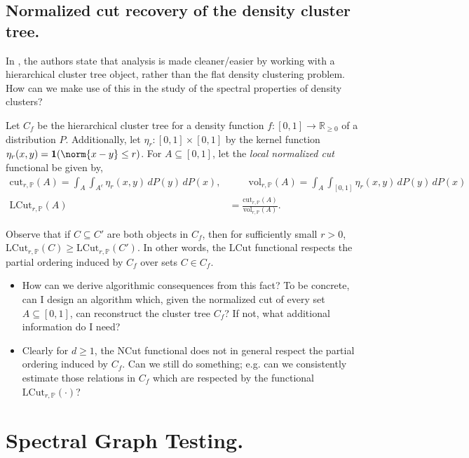 \documentclass{article}
\newcommand{\Reals}{\mathbb{R}}
\newcommand{\1}{\mathbb{I}}
\newcommand{\Pbb}{\mathbb{P}}
\theoremstyle{alden}
\theoremstyle{aldenthm}
\theoremstyle{definition}
\theoremstyle{remark}
\begin{document}
\subsection{Normalized cut recovery of the density cluster tree.}

In \cite{chaudhuri2010}, the authors state that analysis is made cleaner/easier by working with a hierarchical cluster tree object, rather than the flat density clustering problem. How can we make use of this in the study of the spectral properties of density clusters?

Let $C_f$ be the hierarchical cluster tree for a density function $f: [0,1] \to \Reals_{\geq 0}$ of a distribution $P$. Additionally, let $\eta_r: [0,1] \times [0,1]$ by the kernel function $\eta_r(x,y) = \mathbf{1}(\norm{x - y} \leq r)$.  For $A \subseteq [0,1]$, let the \emph{local normalized cut} functional be given by,
\begin{align*}
\mathrm{cut}_{r,\Pbb}(A) = \int_{A} \int_{A^c} \eta_r(x,y) \,dP(y) \,dP(x), & \quad \quad \mathrm{vol}_{r,\Pbb}(A) = \int_{A} \int_{[0,1]} \eta_r(x,y) \,dP(y) \,dP(x) \\ \mathrm{LCut}_{r,\Pbb}(A) & = \frac{\mathrm{cut}_{r,\Pbb}(A)}{\mathrm{vol}_{r,\Pbb}(A)}.
\end{align*}

Observe that if $C \subseteq C'$ are both objects in $C_f$, then for sufficiently small $r > 0$, $\mathrm{LCut}_{r,\Pbb}(C) \geq \mathrm{LCut}_{r,\Pbb}(C')$. In other words, the $\mathrm{LCut}$ functional respects the partial ordering induced by $C_f$ over sets $C \in C_f$. 

\begin{itemize}
	\item How can we derive algorithmic consequences from this fact? To be concrete, can I design an algorithm which, given the normalized cut of every set $A \subseteq [0,1]$, can reconstruct the cluster tree $C_f$? If not, what additional information do I need?
	\item Clearly for $d \geq 1$, the \textrm{NCut} functional does not in general respect the partial ordering induced by $C_f$. Can we still do something; e.g. can we consistently estimate those relations in $C_f$ which are respected by the functional $\mathrm{LCut}_{r,\Pbb}(\cdot)$?
\end{itemize}

\section{Spectral Graph Testing.}
\end{document}
